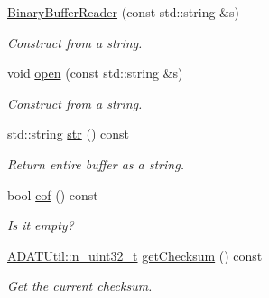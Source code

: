 \begin{DoxyCompactItemize}
\mbox{\hyperlink{classADATIO_1_1BinaryBufferReader_af3ef435054f2f29a596ca4b45b3642e5}{Binary\+Buffer\+Reader}} (const std\+::string \&s)
\begin{DoxyCompactList}\small\item\em Construct from a string. \end{DoxyCompactList}\item 
void \mbox{\hyperlink{classADATIO_1_1BinaryBufferReader_af56c8d00474a1f38f38267c45aa7b433}{open}} (const std\+::string \&s)
\begin{DoxyCompactList}\small\item\em Construct from a string. \end{DoxyCompactList}\item 
std\+::string \mbox{\hyperlink{classADATIO_1_1BinaryBufferReader_a1e960fee8100fbe85f706b45870d95e1}{str}} () const
\begin{DoxyCompactList}\small\item\em Return entire buffer as a string. \end{DoxyCompactList}\item 
bool \mbox{\hyperlink{classADATIO_1_1BinaryBufferReader_ad7957f285235c272d8874d1ab5ffea75}{eof}} () const
\begin{DoxyCompactList}\small\item\em Is it empty? \end{DoxyCompactList}\item 
\mbox{\hyperlink{namespaceADATUtil_ad945a8afa4db2d1f89b731964adae97e}{A\+D\+A\+T\+Util\+::n\+\_\+uint32\+\_\+t}} \mbox{\hyperlink{classADATIO_1_1BinaryBufferReader_ae8e6c22be76223f5e2ce2613e70be4bf}{get\+Checksum}} () const
\begin{DoxyCompactList}\small\item\em Get the current checksum. \end{DoxyCompactList}\end{DoxyCompactItemize}
